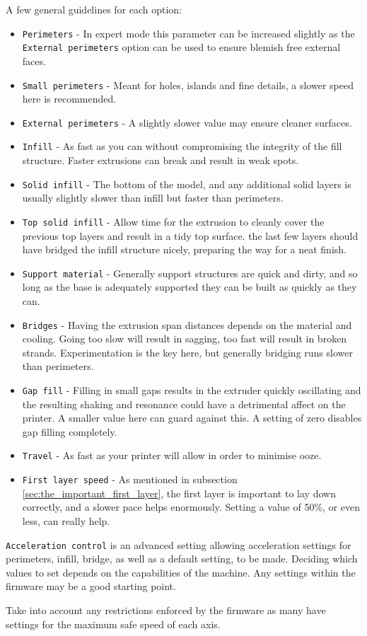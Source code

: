 A few general guidelines for each option:
\begin{itemize}
	\item \texttt{Perimeters}  - In expert mode this parameter can be increased slightly as the \texttt{External perimeters} option can be used to ensure blemish free external faces.
	\item \texttt{Small perimeters}  - Meant for holes, islands and fine details, a slower speed here is recommended.
	\item \texttt{External perimeters}  - A slightly slower value may ensure cleaner surfaces.
	\item \texttt{Infill}  - As fast as you can without compromising the integrity of the fill structure.  Faster extrusions can break and result in weak spots.
	\item \texttt{Solid infill}  - The bottom of the model, and any additional solid layers is usually slightly slower than infill but faster than perimeters.
	\item \texttt{Top solid infill}  - Allow time for the extrusion to cleanly cover the previous top layers and result in a tidy top surface.  the last few layers should have bridged the infill structure nicely, preparing the way for a neat finish.
	\item \texttt{Support material}  - Generally support structures are quick and dirty, and so long as the base is adequately supported they can be built as quickly as they can.
	\item \texttt{Bridges}  - Having the extrusion span distances depends on the material and cooling.  Going too slow will result in sagging, too fast will result in broken strands.  Experimentation is the key here, but generally bridging runs slower than perimeters.
	\item \texttt{Gap fill}  - Filling in small gaps results in the extruder quickly oscillating and the resulting shaking and resonance could have a detrimental affect on the printer.  A smaller value here can guard against this.  A setting of zero disables gap filling completely.
	\item \texttt{Travel}  - As fast as your printer will allow in order to minimise ooze.
	\item \texttt{First layer speed}  - As mentioned in subsection \ref{sec:the_important_first_layer}, the first layer is important to lay down correctly, and a slower pace helps enormously.  Setting a value of 50\%, or even less, can really help.
\end{itemize}

\texttt{Acceleration control} is an advanced setting allowing acceleration settings for perimeters, infill, bridge, as well as a default setting, to be made.  Deciding which values to set depends on the capabilities of the machine.  Any settings within the firmware may be a good starting point.

Take into account any restrictions enforced by the firmware as many have settings for the maximum safe speed of each axis.


